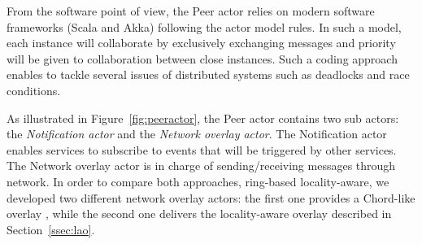 From the software point of view, the Peer actor relies on modern software frameworks (Scala
and Akka) following the actor model rules. In such a model, each instance will
collaborate by exclusively exchanging messages and priority will be given to collaboration
between close instances. Such a coding approach enables to tackle several issues of
distributed systems such as deadlocks and race conditions.

%

As illustrated in Figure~\ref{fig:peeractor}, the Peer actor contains two sub actors: the
\emph{Notification actor} and the \emph{Network overlay actor}. The Notification actor
enables services to subscribe to events that will be triggered by other services. The
Network overlay actor is in charge of sending/receiving messages through network. In order
to compare both approaches, ring-based \vs locality-aware, we developed two different
network overlay actors: the first one provides a Chord-like overlay
\cite{stoica2001chord}, while the second one delivers the locality-aware overlay described
in Section~\ref{ssec:lao}.

